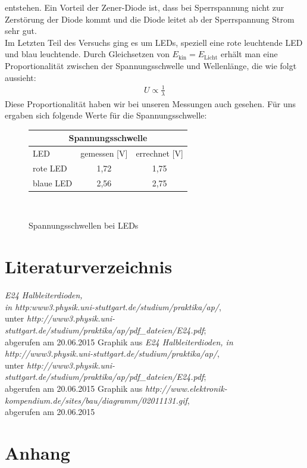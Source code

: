 \documentclass[fontsize=12pt]{scrartcl}
\begin{document}
entstehen. Ein Vorteil der Zener-Diode ist, dass bei Sperrspannung nicht zur Zerstörung der Diode kommt und die Diode leitet ab der Sperrspannung 
Strom sehr gut.\\
\newpage
\noindent
Im Letzten Teil des Versuchs ging es um LEDs, speziell eine rote leuchtende LED und blau leuchtende. Durch Gleichsetzen von  $E_{\text{kin}}=E_{\text{Licht}}$ erhält man eine Proportionalität zwischen der Spannungsschwelle und Wellenlänge, die wie folgt aussieht:
\begin{align*}
U \propto \frac{1}{\lambda}
\end{align*}
Diese Proportionalität haben wir bei unseren Messungen auch gesehen. Für uns ergaben sich folgende Werte für die Spannungsschwelle:
\begin{figure}[H]
\vspace{-15pt}
\caption{Spannungsschwellen bei LEDs}
\centering
\begin{tabular}{|l|c|c|} \hline
\multicolumn{3}{|c|}{ Spannungsschwelle}\\ \hline
LED &gemessen [V]	& errechnet  [V] \\ \hline
rote LED		& 1,72	& 1,75\\ \hline
blaue LED	& 2,56	& 2,75\\ \hline
\end{tabular} \\
\end{figure}


\newpage
\section{Literaturverzeichnis}

\renewcommand{\refname}{~}
\vspace{-30pt}
\begin{thebibliography}{xx}
			\textit{\glqq E24 Halbleiterdioden\grqq , \\
								 in http:www3.physik.uni-stuttgart.de/studium/praktika/ap/},\\
								unter \textit{http://www3.physik.uni-stuttgart.de/studium/praktika/ap/pdf\_dateien/E24.pdf}; \\
								 abgerufen am 20.06.2015
     	Graphik aus \textit{\glqq E24 Halbleiterdioden\grqq , in 	\\
   								http://www3.physik.uni-stuttgart.de/studium/praktika/ap/}, \\
   								unter \textit{http://www3.physik.uni-stuttgart.de/studium/praktika/ap/pdf\_dateien/E24.pdf}; \\
   								abgerufen am 20.06.2015 
     	Graphik aus \textit{http://www.elektronik-kompendium.de/sites/bau/diagramm/02011131.gif}, \\
   								abgerufen am 20.06.2015
\end{thebibliography}

\section{Anhang}
\end{document}
